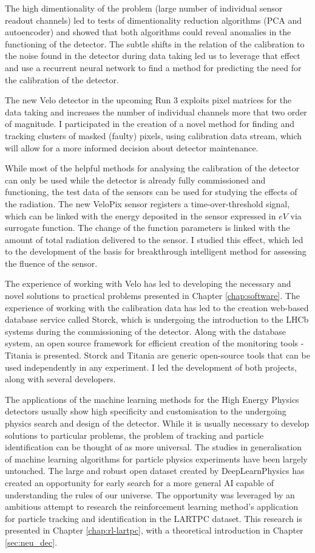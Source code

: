 The high dimentionality of the problem (large number of individual sensor readout channels) led to tests of dimentionality reduction algorithms (PCA and autoencoder) and showed that both algorithms could reveal anomalies in the functioning of the detector.
The subtle shifts in the relation of the calibration to the noise found in the detector during data taking led us to leverage that effect and use a recurrent neural network to find a method for predicting the need for the calibration of the detector.

The new Velo detector in the upcoming Run 3 exploits pixel matrices for the data taking and increases the number of individual channels more that two order of magnitude.
I participated in the creation of a novel method for finding and tracking clusters of masked (faulty) pixels, using calibration data stream, which will allow for a more informed decision about detector maintenance.

While most of the helpful methods for analysing the calibration of the detector can only be used while the detector is already fully commissioned and functioning, the test data of the sensors can be used for studying the effects of the radiation.
The new VeloPix sensor registers a time-over-threshold signal, which can be linked with the energy deposited in the sensor expressed in $eV$ via surrogate function. 
The change of the function parameters is linked with the amount of total radiation delivered to the sensor. I studied this effect, which led to the development of the basis for breakthrough intelligent method for assessing the fluence of the sensor.

The experience of working with Velo has led to developing the necessary and novel solutions to practical problems presented in Chapter \ref{chap:software}.
The experience of working with the calibration data has led to the creation web-based database service called Storck, which is undergoing the introduction to the LHCb systems during the commissioning of the detector.
Along with the database system, an open source framework for efficient creation of the monitoring tools - Titania is presented.
Storck and Titania are generic open-source tools that can be used independently in any experiment.
I led the development of both  projects, along with several developers.

The applications of the machine learning methods for the High Energy Physics detectors usually show high specificity and customisation to the undergoing physics search and design of the detector.
While it is usually necessary to develop solutions to particular problems, the problem of tracking and particle identification can be thought of as more universal.
The studies in generalisation of machine learning algorithms for particle physics experiments have been largely untouched.
The large and robust open dataset created by DeepLearnPhysics has created an opportunity for early search for a more general AI capable of understanding the rules of our universe.
The opportunity was leveraged by an ambitious attempt to research the reinforcement learning method's application for particle tracking and identification in the LARTPC dataset.
This research is presented in Chapter \ref{chap:rl-lartpc}, with a theoretical introduction in Chapter \ref{sec:neu_dec}.

